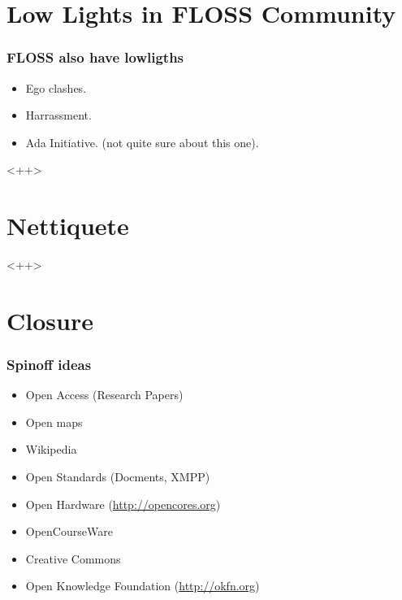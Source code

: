 \documentclass[hyperref={pdfpagelabels=false},xcolor=pst,pdf,fragile]{beamer}
\begin{document}
\section{Low Lights in FLOSS Community}

\begin{frame}
  \frametitle{FLOSS also have lowligths}

  \begin{itemize}
	\item Ego clashes.
	\item Harrassment.
	\item Ada Initiative. (not quite sure about this one).
  \end{itemize}<++>

\end{frame}

\section{Nettiquete}<++>

\section{Closure}

\begin{frame}
  \frametitle{Spinoff ideas}

  \begin{itemize}
	  \item Open Access (Research Papers)

	  \item Open maps
		  \pause
	  \item Wikipedia
		  \pause
	  \item Open Standards (Docments, XMPP)
		  \pause
	  \item Open Hardware (\url{http://opencores.org})
		  \pause
	  \item OpenCourseWare
		  \pause
	  \item Creative Commons
		  \pause
	  \item Open Knowledge Foundation (\url{http://okfn.org})
  \end{itemize}

\end{frame}
\end{document}
